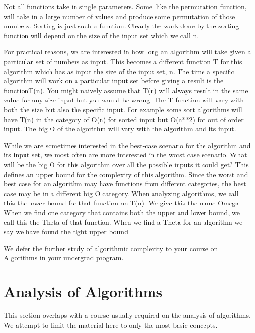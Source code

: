 Not all functions take in single parameters. Some, like the permutation function, will take in a large number of values and produce some permutation of those numbers. Sorting is just such a function. Clearly the work done by the sorting function will depend on the size of the input set which we call n. 

For practical reasons, we are interested in how long an algorithm will take given a particular set of numbers as input. This becomes a different function T for this algorithm which has as input the size of the input set, n. The time a specific algorithm will work on a particular input set before giving a result is the functionT(n). You might naively assume that T(n) will always result in the same value for any size input but you would be wrong. The T function will vary with both the size but also the specific input. For example some sort algorithms will have T(n) in the category of O(n) for sorted input but O(n**2) for out of order input. The big O of the algorithm will vary with the algorithm and its input.

While we are sometimes interested in the best-case scenario for the algorithm and its input set, we most often are more interested in the worst case scenario. What will be the big O for this algorithm over all the possible inputs it could get? This defines an upper bound for the complexity of this algorithm. Since the worst and best case for an algorithm may have functions from different categories, the best case may be in a different big O category. When analyzing algorithms, we call this the lower bound for that function on T(n). We give this the name Omega. When we find one category that contains both the upper and lower bound, we call this the Theta of that function. When we find a Theta for an algorithm we say we have found the tight upper bound 

We defer the further study of algorithmic complexity to your course on Algorithms in your undergrad program.


\section {Analysis of Algorithms}
This section overlaps with a course usually required on the analysis of algorithms. We attempt to limit the material here to only the most basic concepts. 
